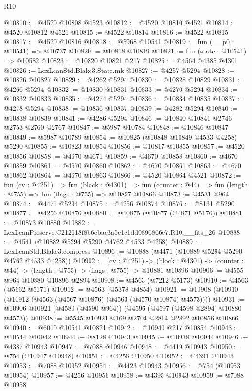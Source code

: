 \begin{lexlean}{R10}
\begin{coremodule}
@10810 := @4520 @10808 @4523
@10812 := @4520 @10810 @4521
@10814 := @4520 @10812 @4521
@10815 := @4522 @10814
@10816 := @4522 @10815
@10817 := @4520 @10816
@10818 := @5968 @10541
@10819 := fun (__p0 : @10541) => @10737
@10820 := @10818 @10819
@10821 := fun (state : @10541) => @10582
@10823 := @10820 @10821 @217
@10825 := @4564 @4385 @4301
@10826 := LexLeanStd.Blake3.State.mk
@10827 := @4257 @5294
@10828 := @10826 @10827
@10829 := @4262 @5294
@10830 := @10828 @10829
@10831 := @4266 @5294
@10832 := @10830 @10831
@10833 := @4270 @5294
@10834 := @10832 @10833
@10835 := @4274 @5294
@10836 := @10834 @10835
@10837 := @4278 @5294
@10838 := @10836 @10837
@10839 := @4282 @5294
@10840 := @10838 @10839
@10841 := @4286 @5294
@10846 := @10840 @10841 @2746 @2753 @2760 @2767
@10847 := @5987 @10784
@10848 := @10846 @10847
@10849 := @5987 @10789
@10854 := @10825 (@10848 @10849 @4533 @4258) @5290
@10855 := @10823 @10854
@10856 := @10817 @10855
@10857 := @4520 @10856
@10858 := @4670 @4671
@10859 := @4670 @10858
@10860 := @4670 @10859
@10861 := @4670 @10860
@10862 := @4670 @10861
@10863 := @4670 @10862
@10864 := @4670 @10863
@10866 := @4520 @10864 @4521
@10872 := fun (cv : @4251) =>
  fun (block : @4301) =>
  fun (counter : @44) => fun (length : @755) => fun (flags : @755) => @10857 @10866
@10873 := @4531 @964
@10874 := @4471 @5294
@10875 := @4256 @10874
@10876 := @8131 @5290
@10877 := @4256 @10876
@10880 := @10875 (@10877 (@4871 @5176))
@10881 := @10873 @10880
@10882 := LexLeanPreserve.C212618f8b6ebac3a5c1e1dd0896866e7.R10.__fits_26
@10888 := @4541 (@10882 @5294 @5290 @4762 @4533 @4258)
@10889 := LexLeanStd.Blake3.compress
@10896 := @10888 (@4471 (@10889 @5294 @5290 @4762 @4533 @4258))
@10902 := (cv : @4251) ->
  (block : @4301) -> (counter : @44) -> (length : @755) -> (flags : @755) -> @10881 @10896
@10906 := @4555 @964 @10880 @10896 @2894
@10908 := @4563 (@7212 @5173)
@10910 := @4563 (@5662 @5171)
@10912 := @4563 (@5378 @4854)
@10921 := @10908 (@10910 (@10912 (@4563 (@4567 @10876) (@4563 (@4570 @10874) @4573))))
@10931 := @10906 @10921 (@4580 (@4590 @964)) (@4596 (@4597 (@4598 @2894) @10880 @4573))
@10938 := @5545 @10921 @169 @2704 @2814 @2892 @10856 @10866
@10940 := @6010 @10541 @10821
@10942 := @10940 @217 @10854
@10943 := @10544 @10942
@10944 := @8128 @10943
@10945 := @10938 @10944
@10946 := @4387 @10943
@10947 := @7088 @10946
@10948 := @4419 @10943
@10950 := @754 (@10947 @10948)
@10951 := @4256 @10950
@10952 := @4391 @10943
@10953 := @7088 @10952
@10954 := @4423 @10943
@10956 := @754 (@10953 @10954)
@10957 := @4256 @10956
@10958 := @4395 @10943
@10959 := @7088 @10958

\end{coremodule}
\end{lexlean}
